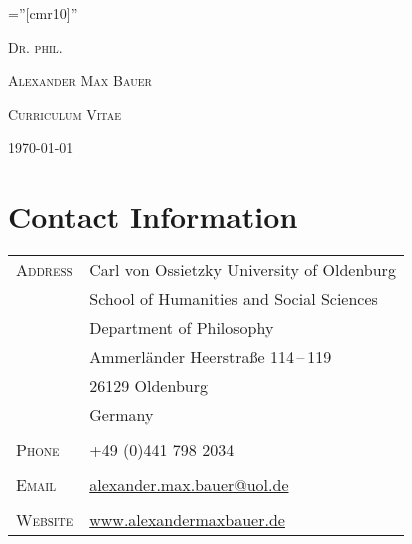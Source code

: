 \documentclass[a4paper,10pt]{article}
\begin{document}
\pagestyle{plain}
\font\fb=''[cmr10]''

\par{\centering
   {\Large\textsc{Dr\hspace{0.5pt}. phil\hspace{0.5pt}.}
   }\bigskip\par}

\par{\centering
   {\Huge\textsc{Alexander Max Bauer}
   }\bigskip\par}

\vspace{1cm}
\par{\centering
   {\Large\textsc{Curriculum Vitae}
   }\bigskip\par}

\par{\centering
   {\Large\textsc{\monthyeardate\today}
   }\bigskip\par}

\vfill
\begin{center}
\end{center}
\vfill


\clearpage
\section{Contact Information}
\begin{longtable}{p{4cm}p{11.5cm}}
   \textsc{Address}     & Carl von Ossietzky University of Oldenburg\\
                        & School of Humanities and Social Sciences\\
                        & Department of Philosophy\\
                        & Ammerländer Heerstraße 114\,--\,119\\
                        & 26129 Oldenburg\\
                        & Germany \\
                        & \\
   \textsc{Phone}       & +49 (0)441 798 2034\\
                        & \\
   \textsc{Email}      & \href{mailto:alexander.max.bauer@uol.de}{alexander.max.bauer@uol.de}\\
                        & \\
   \textsc{Website}     & \href{http://www.alexandermaxbauer.de/}{www.alexandermaxbauer.de}
\end{longtable}
\end{document}
